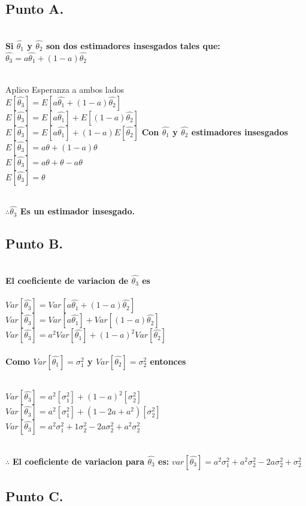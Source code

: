 \documentclass[letterpaper,12pt,onecolumn,titlepage]{article}
\begin{document}
\subsection{Punto A.}
~\\\textbf{Si $\hat{\theta_1}$ y $\hat{\theta_2}$ son dos estimadores insesgados tales que:
~\\$\hat{\theta_3}=a{\hat{\theta_1}}+(1-a){\hat{\theta_2}}$}

~\\ Aplico Esperanza a ambos lados 
~\\ $E[\hat{\theta_3}] = E[a{\hat{\theta_1}}+(1-a){\hat{\theta_2}}]$
~\\ $E[\hat{\theta_3}] = E[a{\hat{\theta_1}}]+E[(1-a){\hat{\theta_2}}]$
~\\ $E[\hat{\theta_3}] = E[a{\hat{\theta_1}}]+(1-a)E[{\hat{\theta_2}}]$ \textbf{Con $\hat{\theta_1}$ y $\hat{\theta_2}$ estimadores insesgados}\
~\\ $E[\hat{\theta_3}] = a{\theta} + (1-a){\theta}$
~\\ $E[\hat{\theta_3}] = a{\theta} + {\theta} - a{\theta}$
~\\$E[\hat{\theta_3}]={\theta}$

~\\\textbf{$\therefore \hat{\theta_3}$ Es un estimador insesgado.} 
 


\subsection{Punto B.} 

~\\\textbf{ El coeficiente de variacion de $\hat{\theta_3}$ es}
~\\
~\\ $Var[\hat{\theta_3}]=Var[a{\hat{\theta_1}}+(1-a){\hat{\theta_2}}]$
~\\ $Var[\hat{\theta_3}]=Var[a{\hat{\theta_1}}]+Var[(1-a){\hat{\theta_2}}]$
~\\ $Var[\hat{\theta_3}]=a^2Var[{\hat{\theta_1}}]+(1-a)^2Var[{\hat{\theta_2}}]$
~\\
~\\\textbf{Como $Var[{\hat{\theta_1}}]=\sigma_1^2$ y $Var[{\hat{\theta_2}}]=\sigma_2^2$ entonces}

~\\ $Var[\hat{\theta_3}]=a^2[\sigma_1^2]+(1-a)^2[\sigma_2^2]$
~\\ $Var[\hat{\theta_3}]=a^2[\sigma_1^2]+(1-2a+a^2)[\sigma_2^2]$
~\\ $Var[\hat{\theta_3}]=a^2\sigma_1^2+1\sigma_2^2-2a\sigma_2^2+a^2\sigma_2^2$

~\\$\therefore$ \textbf{El coeficiente de variacion para $\hat{\theta_3}$ es:}  
$var[\hat{\theta_3}]=a^2\sigma_1^2+a^2\sigma_2^2-2a\sigma_2^2+\sigma_2^2$


\subsection{Punto C.} 





\end{document}
